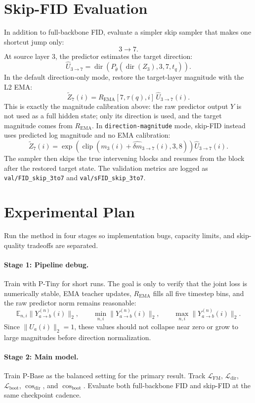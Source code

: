 \documentclass[11pt]{article}
\begin{document}
\section{Skip-FID Evaluation}
In addition to full-backbone FID, evaluate a simpler skip sampler that makes
one shortcut jump only:
\[
    3\rightarrow7.
\]
At source layer $3$, the predictor estimates the target direction:
\[
    \hat U_{3\rightarrow7}
    =
    \operatorname{dir}(P_{\bar\theta}(\operatorname{dir}(Z_3),3,7,t_q)).
\]
In the default direction-only mode, restore the target-layer magnitude with
the L2 EMA:
\[
    \tilde Z_7(i)=
    R_{\mathrm{EMA}}[7,\tau(q),i]\,
    \hat U_{3\rightarrow7}(i).
\]
This is exactly the magnitude calibration above: the raw predictor output
$Y$ is not used as a full hidden state; only its direction is used, and the
target magnitude comes from $R_{\mathrm{EMA}}$.
In \texttt{direction-magnitude} mode, skip-FID instead uses predicted log
magnitude and no EMA calibration:
\[
    \tilde Z_7(i)=
    \exp\!\left(\operatorname{clip}\left(
    m_3(i)+\hat{\delta m}_{3\rightarrow7}(i),3,8
    \right)\right)\hat U_{3\rightarrow7}(i).
\]
The sampler then skips the true intervening blocks and resumes from the block
after the restored target state. The validation metrics are logged as
\texttt{val/FID\_skip\_3to7} and \texttt{val/sFID\_skip\_3to7}.

\section{Experimental Plan}
Run the method in four stages so implementation bugs, capacity limits, and
skip-quality tradeoffs are separated.

\paragraph{Stage 1: Pipeline debug.}
Train with P-Tiny for short runs. The goal is only to verify that the joint
loss is numerically stable, EMA teacher updates, $R_{\mathrm{EMA}}$ fills all
five timestep bins, and the raw predictor norm remains reasonable:
\[
    \mathbb{E}_{n,i}\|Y_{a\rightarrow b}^{(n)}(i)\|_2,\qquad
    \min_{n,i}\|Y_{a\rightarrow b}^{(n)}(i)\|_2,\qquad
    \max_{n,i}\|Y_{a\rightarrow b}^{(n)}(i)\|_2 .
\]
Since $\|U_a(i)\|_2=1$, these values should not collapse near zero or grow to
large magnitudes before direction normalization.

\paragraph{Stage 2: Main model.}
Train P-Base as the balanced setting for the primary result. Track
$\mathcal{L}_{\mathrm{FM}}$, $\mathcal{L}_{\mathrm{dir}}$,
$\mathcal{L}_{\mathrm{boot}}$, $\cos_{\mathrm{dir}}$, and
$\cos_{\mathrm{boot}}$. Evaluate both full-backbone FID and skip-FID at the
same checkpoint cadence.
\end{document}
